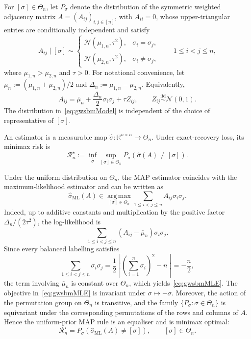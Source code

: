 \documentclass[11pt]{article}
\theoremstyle{definition}
\theoremstyle{remark}
\newcommand{\1}{\boldsymbol{1}}
\begin{document}
For $[\sigma]\in\Theta_n$, let $P_\sigma$ denote the distribution of
the symmetric weighted adjacency matrix
\(A=(A_{ij})_{i,j\in[n]}\), with \(A_{ii}=0\),
whose upper-triangular entries are conditionally independent and
satisfy
\begin{equation}
A_{ij}\mid[\sigma]
\sim
\begin{cases}
\mathcal N(\mu_{1,n},\tau^2),
&
\sigma_i=\sigma_j,
\\[1mm]
\mathcal N(\mu_{2,n},\tau^2),
&
\sigma_i\neq\sigma_j,
\end{cases}
\qquad
1\leq i<j\leq n,
\label{eq:gwsbmModel}
\end{equation}
where $\mu_{1,n}>\mu_{2,n}$ and $\tau>0$. For notational convenience, let
\(\overline\mu_n:=(\mu_{1,n}+\mu_{2,n})/2\) and
\(\Delta_n:=\mu_{1,n}-\mu_{2,n}\).
Equivalently,
\begin{equation}
A_{ij}
=
\overline\mu_n
+
\frac{\Delta_n}{2}\sigma_i\sigma_j
+
\tau Z_{ij},
\qquad
Z_{ij}\overset{\mathrm{iid}}{\sim}\mathcal N(0,1).
\label{eq:gwsbmSignalNoiseForm}
\end{equation} 
The distribution in~\eqref{eq:gwsbmModel} is independent of the
choice of representative of $[\sigma]$.

An estimator is a measurable map
\(\widehat\sigma:\mathbb R^{n\times n}\to\Theta_n\).
Under exact-recovery loss, its minimax risk is
\begin{equation}
\mathcal R_n^\star
:=
\inf_{\widehat\sigma}
\sup_{[\sigma]\in\Theta_n}
P_\sigma
\left(
\widehat\sigma(A)\neq[\sigma]
\right).
\label{eq:gwsbmMinimaxRisk}
\end{equation}

Under the uniform distribution on $\Theta_n$, the MAP estimator
coincides with the maximum-likelihood estimator and can be written as
\begin{equation}
\widehat\sigma_{\mathrm{ML}}(A)
\in
\operatorname*{arg\,max}_{[\sigma]\in\Theta_n}
\sum_{1\leq i<j\leq n}
A_{ij}\sigma_i\sigma_j.
\label{eq:gwsbmMLE}
\end{equation}
Indeed, up to additive constants and multiplication by the positive
factor $\Delta_n/(2\tau^2)$, the log-likelihood is
\[
\sum_{1\leq i<j\leq n}
\left(A_{ij}-\overline\mu_n\right)\sigma_i\sigma_j.
\]
Since every balanced labelling satisfies
\[
\sum_{1\leq i<j\leq n}\sigma_i\sigma_j
=
\frac12
\left[
\left(\sum_{i=1}^n\sigma_i\right)^2-n
\right]
=
-\frac n2,
\]
the term involving $\overline\mu_n$ is constant over $\Theta_n$,
which yields~\eqref{eq:gwsbmMLE}.
The objective in~\eqref{eq:gwsbmMLE} is invariant under
$\sigma\mapsto-\sigma$. Moreover, the action of the permutation group
on $\Theta_n$ is transitive, and the family $\{P_\sigma:\sigma\in\Theta_n\}$
is equivariant under the corresponding permutations of the rows and columns
of $A$. Hence the
uniform-prior MAP rule is an equaliser and is minimax optimal:
\begin{equation}
\mathcal R_n^\star
=
P_\sigma
\left(
\widehat\sigma_{\mathrm{ML}}(A)\neq[\sigma]
\right),
\qquad
[\sigma]\in\Theta_n.
\label{eq:gwsbmMLEMinimax}
\end{equation}
\end{document}
